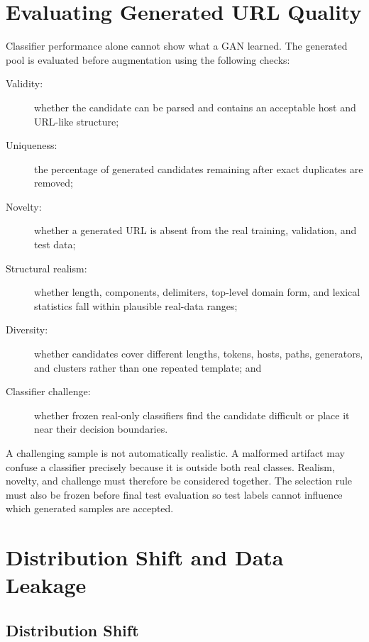 \section{Evaluating Generated URL Quality}

Classifier performance alone cannot show what a GAN learned. The generated
pool is evaluated before augmentation using the following checks:

\begin{description}
\item[Validity:] whether the candidate can be parsed and contains an acceptable
host and URL-like structure;

\item[Uniqueness:] the percentage of generated candidates remaining after exact
duplicates are removed;

\item[Novelty:] whether a generated URL is absent from the real training,
validation, and test data;

\item[Structural realism:] whether length, components, delimiters, top-level
domain form, and lexical statistics fall within plausible real-data ranges;

\item[Diversity:] whether candidates cover different lengths, tokens, hosts,
paths, generators, and clusters rather than one repeated template; and

\item[Classifier challenge:] whether frozen real-only classifiers find the
candidate difficult or place it near their decision boundaries.
\end{description}

A challenging sample is not automatically realistic. A malformed artifact may
confuse a classifier precisely because it is outside both real classes.
Realism, novelty, and challenge must therefore be considered together. The
selection rule must also be frozen before final test evaluation so test labels
cannot influence which generated samples are accepted.

\section{Distribution Shift and Data Leakage}

\subsection{Distribution Shift}

